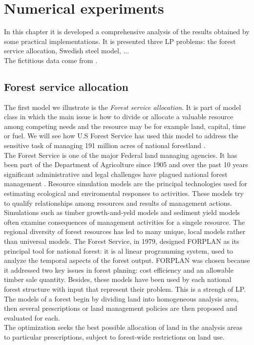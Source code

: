 \documentclass[a4paper,10 pt,titlepage,twoside]{book}
\theoremstyle{plain}
\theoremstyle{definition}
\theoremstyle{remark}
\begin{document}
\chapter{Numerical experiments}
In this chapter it is developed a comprehensive analysis of the results obtained by some practical implementations. It is presented three LP problems: the forest service allocation, Swedish steel model, ...\\
The fictitious data come from \cite{RR}.
\section{Forest service allocation} 
The first model we illustrate is the \textit{Forest service allocation}. It is part of model class in which the main issue is how to divide or allocate a valuable resource among competing needs and the resource may be for example land, capital, time or fuel. We will see how U.S Forest Service has used this model to address the sensitive task of managing 191 million acres of national forestland \cite{(Natural)}.\\
The Forest Service is one of the major Federal land managing agencies. It has been part of the Department of Agricolture since 1905 and over the past 10 years significant administrative and legal challenges have plagued national forest management \cite{ForSer}. Resource simulation models are the principal technologies used for estimating ecological and enviromental responses to activities. These models try to qualify relationships among resources and results of management actions. Simulations such as timber growth-and-yeld models and sediment yield models often examine consequences of management activities for a singele resource. The regional diversity of forest resources has led to many unique, local models rather than universal models. The Forest Service, in 1979, designed FORPLAN as its principal tool for national forest: it is al linear programming system, used to analyze the temporal aspects of the forest output. FORPLAN was chosen because it addressed two key issues in forest plnning: cost efficiency and an allowable timber sale quantity. Besides, these models have been used by each national forest structure with input that represent their problem. This is a strengh of LP. \\
The models of a forest begin  by dividing land into homogeneous analysis area, then several prescriptions or land management policies are then proposed and evaluated for each. \\The optimization seeks the best possible allocation of land in the analysis areas to particular prescriptions, subject to forest-wide restrictions on land use.
\end{document}
